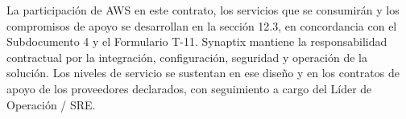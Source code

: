 La participación de AWS en este contrato, los servicios que se consumirán y los compromisos de apoyo se desarrollan en la sección 12.3, en concordancia con el Subdocumento 4 y el Formulario T-11. Synaptix mantiene la responsabilidad contractual por la integración, configuración, seguridad y operación de la solución. Los niveles de servicio se sustentan en ese diseño y en los contratos de apoyo de los proveedores declarados, con seguimiento a cargo del Líder de Operación / SRE.
